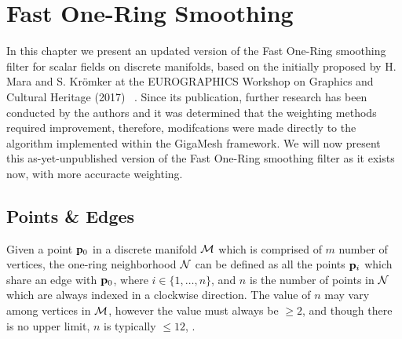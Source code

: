 \chapter{Fast One-Ring Smoothing}
In this chapter we present an updated version of the Fast One-Ring smoothing filter for scalar fields on discrete manifolds, based on the initially proposed by H. Mara and S. Krömker at the EUROGRAPHICS Workshop on Graphics and Cultural Heritage (2017) ~\cite[s.~3.2]{Mara17}. Since its publication, further research has been conducted by the authors and it was determined that the weighting methods required improvement, therefore, modifcations were made directly to the algorithm implemented within the GigaMesh \todoCitation framework. We will now present this as-yet-unpublished version of the Fast One-Ring smoothing filter as it exists now, with more accuracte weighting.
%
\section{Points \& Edges}
\label{cFONSsPE}
Given a point $\mathbf{p}_0$ in a discrete manifold $\mathcal{M}$ which is comprised of $m$ number of vertices, the one-ring neighborhood $\mathcal{N}$ can be defined as all the points $\mathbf{p}_i$ which share an edge with $\mathbf{p}_0$, where $i \in \{1, \ldots, n\}$, and $n$ is the number of points in $\mathcal{N}$ which are always indexed in a clockwise direction. The value of $n$ may vary among vertices in $\mathcal{M}$, however the value must always be $\geq 2$, and though there is no upper limit, $n$ is typically $\leq 12$, .%
%
%
%
%
%
%
%

